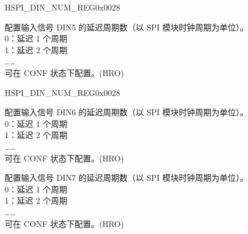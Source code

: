 \begin{register}{H}{SPI\_DIN\_NUM\_REG}{0x0028}
\begin{regdesc}
\begin{reglist}
\label{fielddesc:SPIDIN5NUM}\item [SPI\_DIN5\_NUM] 配置输入信号 DIN5 的延迟周期数（以 SPI 模块时钟周期为单位）。\\
0：延迟 1 个周期\\
1：延迟 2 个周期\\
……\\
可在 CONF 状态下配置。(HRO)

\item [见下页]
\end{reglist}\end{regdesc}
\end{register}

\addtocounter{Regfloat}{-1}
\begin{register}{H}{SPI\_DIN\_NUM\_REG}{0x0028}
\begin{regdesc}\begin{reglist}
\item [接上页]

\label{fielddesc:SPIDIN6NUM}\item [SPI\_DIN6\_NUM] 配置输入信号 DIN6 的延迟周期数（以 SPI 模块时钟周期为单位）。\\
0：延迟 1 个周期\\
1：延迟 2 个周期\\
……\\
可在 CONF 状态下配置。(HRO)

\label{fielddesc:SPIDIN7NUM}\item [SPI\_DIN7\_NUM] 配置输入信号 DIN7 的延迟周期数（以 SPI 模块时钟周期为单位）。\\
0：延迟 1 个周期\\
1：延迟 2 个周期\\
……\\
可在 CONF 状态下配置。(HRO)
\end{reglist}\end{regdesc}
\end{register}



